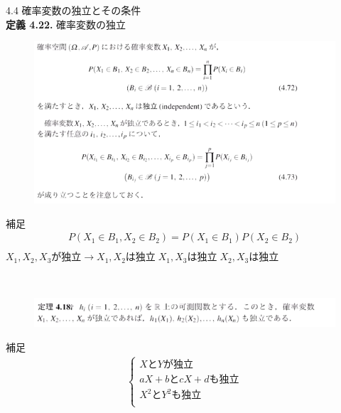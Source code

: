 \documentclass[dvipdfmx,10pt, a4j]{jarticle}
\theoremstyle{definition}
\begin{document}
\noindent
{\LARGE 4.4 確率変数の独立とその条件}\\

\noindent
\textbf{定義 4.22.} 確率変数の独立\\
\begin{figure}[htbp]
\includegraphics[width=\linewidth]{D_11/teigi/4_22.png}
\end{figure}

\begin{itembox}[l]{補足}
  \begin{align*}
    P(X_1 \in B_1, X_2 \in B_2) = P(X_1 \in B_1)P(X_2 \in B_2)\\
  \end{align*}
  $X_1, X_2, X_3 が独立 \to X_1, X_2 は独立 \; X_1, X_3 は独立 \; X_2, X_3 は独立$\\
\end{itembox}\\

\noindent
\begin{figure}[htbp]
\includegraphics[width=\linewidth]{D_11/teiri/4_18.png}
\end{figure}

\begin{itembox}[l]{補足}
  \begin{align*}
    \begin{cases}
      XとYが独立\\
      aX+b と cX+d も独立\\
      X^2 と Y^2 も独立\\
    \end{cases}
  \end{align*}
\end{itembox}\\
\end{document}
